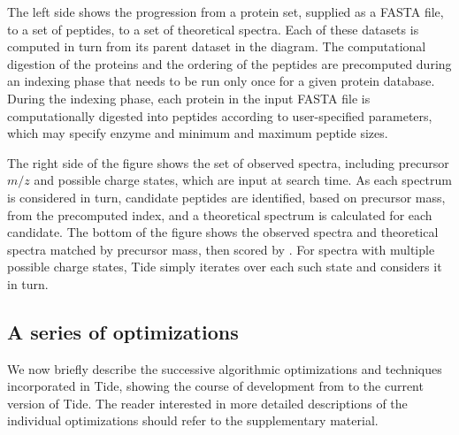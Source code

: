 The left side shows the progression from a protein set, supplied as a
FASTA file, to a set of peptides, to a set of theoretical
spectra. Each of these datasets is computed in turn from its parent
dataset in the diagram. The computational digestion of the proteins
and the ordering of the peptides are precomputed during an indexing
phase that needs to be run only once for a given protein database.
During the indexing phase, each protein in the input FASTA file is
computationally digested into peptides according to user-specified
parameters, which may specify enzyme and minimum and maximum peptide
sizes.

The right side of the figure shows the set of observed spectra,
including precursor $m/z$ and possible charge states, which are input
at search time. As each spectrum is considered in turn, candidate
peptides are identified, based on precursor mass, from the precomputed
index, and a theoretical spectrum is calculated for each
candidate. The bottom of the figure shows the observed spectra and
theoretical spectra matched by precursor mass, then scored by
\XCorr. For spectra with multiple possible charge states, Tide simply
iterates over each such state and considers it in turn.


\subsection{A series of optimizations \label{subsection:optimizations}}

We now briefly describe the successive algorithmic optimizations and
techniques incorporated in Tide, showing the course of development
from \tidezero to the current version of Tide. The reader interested
in more detailed descriptions of the individual optimizations should
refer to the supplementary material.

